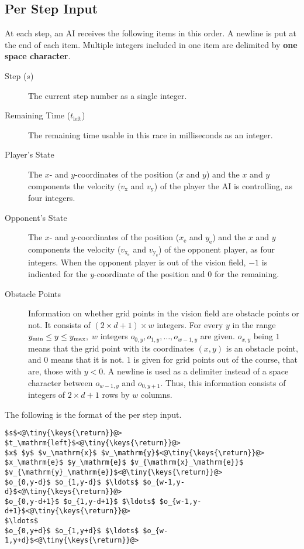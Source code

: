 \documentclass[11pt]{article}
\begin{document}
\subsection{Per Step Input}
At each step, an AI receives the following items in this order.
A newline is put at the end of each item. Multiple integers included in one item are delimited by {\bf one space character}.
\begin{description}
\item[Step ($s$)] The current step number as a single integer.
\item[Remaining Time ($t_\mathrm{left}$)] The remaining time usable in this race in
  milliseconds as an integer.
\item[Player's State] The $x$- and $y$-coordinates of the position ($x$ and $y$) and
  the $x$ and $y$ components the velocity $(v_\mathrm{x}$ and $v_\mathrm{y}$) of the player the AI is
  controlling, as four integers.
\item[Opponent's State] The $x$- and $y$-coordinates of the position ($x_\mathrm{e}$ and $y_\mathrm{e}$) and
  the $x$ and $y$ components the velocity ($v_{\mathrm{x}_\mathrm{e}}$ and $v_{\mathrm{y}_\mathrm{e}}$) of the opponent player, as
  four integers.  When the opponent player is out of the vision field,
  $-1$ is indicated for the $y$-coordinate of the position and $0$ for
  the remaining.
\item[Obstacle Points] Information on whether grid points in
  the vision field are obstacle points or not.  It consists of
  $(2\times d+1)\times w$ integers.  For every $y$ in the range
  $y_{\rm min} \le y \le y_{\rm max},$ $w$ integers $o_{0,y}, o_{1,y},
  \ldots, o_{w-1,y}$ are given.  $o_{x,y}$ being $1$ means that the
  grid point with its coordinates $(x,y)$ is an obstacle point, and
  $0$ means that it is not.  $1$ is given for grid points out of the
  course, that are, those with $y<0$.  A newline is used as a
  delimiter instead of a space character between $o_{w-1,y}$ and $o_{0,y+1}$.
  Thus, this information consists of integers of $2 \times d + 1$ rows by $w$ columns.

\end{description}

\noindent
The following is the format of the per step input.

\begin{lstlisting}
$s$<@\tiny{\keys{\return}}@>
$t_\mathrm{left}$<@\tiny{\keys{\return}}@>
$x$ $y$ $v_\mathrm{x}$ $v_\mathrm{y}$<@\tiny{\keys{\return}}@>
$x_\mathrm{e}$ $y_\mathrm{e}$ $v_{\mathrm{x}_\mathrm{e}}$ $v_{\mathrm{y}_\mathrm{e}}$<@\tiny{\keys{\return}}@>
$o_{0,y-d}$ $o_{1,y-d}$ $\ldots$ $o_{w-1,y-d}$<@\tiny{\keys{\return}}@>
$o_{0,y-d+1}$ $o_{1,y-d+1}$ $\ldots$ $o_{w-1,y-d+1}$<@\tiny{\keys{\return}}@>
$\ldots$
$o_{0,y+d}$ $o_{1,y+d}$ $\ldots$ $o_{w-1,y+d}$<@\tiny{\keys{\return}}@>
\end{lstlisting}
\end{document}
